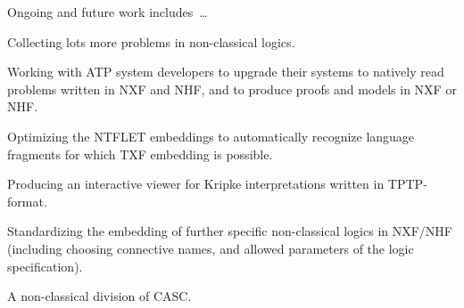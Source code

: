 \documentclass[runningheads]{llncs}
\newenvironment{packed_itemize}{
\vspace*{-0.5em}
\begin{itemize}
\setlength{\partopsep}{0pt}
\setlength{\itemsep}{1pt}
\setlength{\parskip}{0pt}
\setlength{\parsep}{0pt}
}{\end{itemize}}
\begin{document}
Ongoing and future work includes~\ldots
\begin{packed_itemize}
\item Collecting lots more problems in non-classical logics.
\item Working with ATP system developers to upgrade their systems to natively read problems 
      written in NXF and NHF, and to produce proofs and models in NXF or NHF.
\item Optimizing the NTFLET embeddings to automatically recognize language fragments for which
      TXF embedding is possible.
\item Producing an interactive viewer for Kripke interpretations written in TPTP-format.
\item Standardizing the embedding of further specific non-classical logics in NXF/NHF (including
      choosing connective names, and allowed parameters of the logic specification).
\item A non-classical division of CASC.
\end{packed_itemize}



\end{document}
